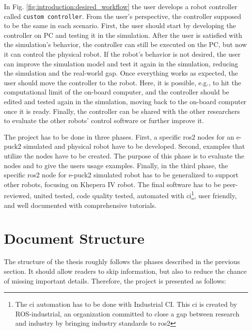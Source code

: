 In Fig. \ref{fig:introduction:desired_workflow} the user develops a robot controller called \texttt{custom controller}. From the user's perspective, the controller supposed to be the same in each scenario. First, the user should start by developing the controller on PC and testing it in the simulation. After the user is satisfied with the simulation's behavior, the controller can still be executed on the PC, but now it can control the physical robot. If the robot's behavior is not desired, the user can improve the simulation model and test it again in the simulation, reducing the simulation and the real-world gap. Once everything works as expected, the user should move the controller to the robot. Here, it is possible, e.g., to hit the computational limit of the on-board computer, and the controller should be edited and tested again in the simulation, moving back to the on-board computer once it is ready. Finally, the controller can be shared with the other researchers to evaluate the other robots' control software or further improve it.

The project has to be done in three phases. First, a specific \ac{ros2} nodes for an e-puck2 simulated and physical robot have to be developed. Second, examples that utilize the nodes have to be created. The purpose of this phase is to evaluate the nodes and to give the users usage examples. Finally, in the third phase, the specific \ac{ros2} node for e-puck2 simulated robot has to be generalized to support other robots, focusing on Khepera IV robot. The final software has to be peer-reviewed, united tested, code quality tested, automated with \ac{ci}\footnote{The \ac{ci} automation has to be done with Industrial CI. This \ac{ci} is created by ROS-industrial, an organization committed to close a gap between research and industry by bringing industry standards to \ac{ros2}}, user friendly, and well documented with comprehensive tutorials.

\section{Document Structure}

The structure of the thesis roughly follows the phases described in the previous section. It should allow readers to skip information, but also to reduce the chance of missing important details. Therefore, the project is presented as follows:

